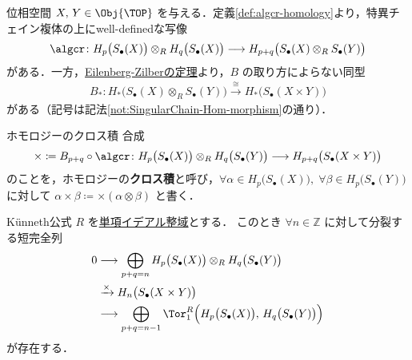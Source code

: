 \documentclass[algtopo_main]{subfiles}
\begin{document}

位相空間 $X,\, Y \in \Obj{\TOP}$ を与える．定義\ref{def:algcr-homology}より，特異チェイン複体の上にwell-definedな写像
\begin{align}
    \algcr \colon H_p \bigl( S_\bullet (X) \bigr) \otimes_R H_q \bigl( S_\bullet (X) \bigr) \lto H_{p+q} \bigl( S_\bullet(X) \otimes_R S_\bullet(Y) \bigr) 
\end{align}
がある．一方，\hyperref[thm:EZ]{Eilenberg-Zilberの定理}より，$B$ の取り方によらない同型
\begin{align}
    B_* \colon H_* \bigl( S_\bullet (X) \otimes_R S_\bullet (Y) \bigr)  \xrightarrow{\cong} H_* \bigl( S_\bullet(X \times Y) \bigr) 
\end{align}
がある（記号は記法\eqref{not:SingularChain-Hom-morphism}の通り）．

\begin{mydef}[label=def:homology-cross]{ホモロジーのクロス積}
    合成
    \begin{align}
        \times  \coloneqq B_{p+q} \circ \algcr \colon H_p \bigl( S_\bullet (X) \bigr) \otimes_R H_q \bigl( S_\bullet (Y) \bigr) \lto H_{p+q} \bigl( S_\bullet(X \times Y) \bigr) 
    \end{align}
    のことを，ホモロジーの\textbf{クロス積}と呼び，$\forall \alpha \in H_p \bigl( S_\bullet(X) \bigr),\; \forall \beta \in H_p \bigl( S_\bullet(Y) \bigr) $ に対して $\alpha \times \beta \coloneqq \times(\alpha \otimes \beta)$ と書く．
\end{mydef}

\begin{mytheo}[label=thm:Kunneth-1]{K\"unneth公式}
    $R$ を\hyperref[def:PID]{単項イデアル整域}とする．
    このとき $\forall n \in \mathbb{Z}$ に対して分裂する短完全列
    \begin{align}
        0 &\lto \bigoplus_{p+q=n} H_p \bigl( S_\bullet(X) \bigr) \otimes_R H_{q} \bigl( S_\bullet(Y) \bigr) \\
        &\xrightarrow{\times} H_n \bigl( S_\bullet(X \times Y) \bigr) \\
        &\lto \bigoplus_{p+q=n-1} \Tor^R_1 \Bigl( H_p \bigl(S_\bullet (X)\bigr),\, H_{q} \bigl(S_\bullet (Y)\bigr) \Bigr) 
    \end{align}
    が存在する．
\end{mytheo}
\end{document}
